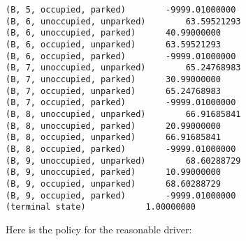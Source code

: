 \documentclass[paper=a4, fontsize=11pt]{scrartcl}
\begin{document}
\begin{verbatim}
(B, 5, occupied, parked)		-9999.01000000
(B, 6, unoccupied, unparked)		63.59521293
(B, 6, unoccupied, parked)		40.99000000
(B, 6, occupied, unparked)		63.59521293
(B, 6, occupied, parked)		-9999.01000000
(B, 7, unoccupied, unparked)		65.24768983
(B, 7, unoccupied, parked)		30.99000000
(B, 7, occupied, unparked)		65.24768983
(B, 7, occupied, parked)		-9999.01000000
(B, 8, unoccupied, unparked)		66.91685841
(B, 8, unoccupied, parked)		20.99000000
(B, 8, occupied, unparked)		66.91685841
(B, 8, occupied, parked)		-9999.01000000
(B, 9, unoccupied, unparked)		68.60288729
(B, 9, unoccupied, parked)		10.99000000
(B, 9, occupied, unparked)		68.60288729
(B, 9, occupied, parked)		-9999.01000000
(terminal state)			1.00000000
\end{verbatim}

Here is the policy for the reasonable driver:
\end{document}
